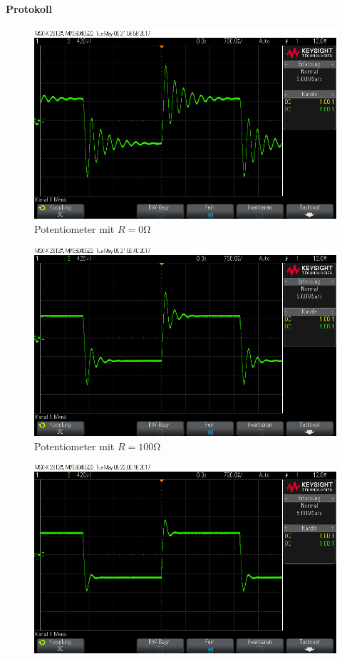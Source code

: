 \documentclass[10pt]{scrreprt}
\begin{document}
        \paragraph{Protokoll}
        \begin{center}
            \begin{figure}[H]
                \includegraphics[width=\textwidth]{scope_14.png}
                \caption{Potentiometer mit $R = 0\si{\ohm}$}
            \end{figure}
            \begin{figure}[H]
                \includegraphics[width=\textwidth]{scope_15.png}
                \caption{Potentiometer mit $R = 100\si{\ohm}$}
            \end{figure}
            \begin{figure}[H]
                \includegraphics[width=\textwidth]{scope_16.png}

\end{figure}
\end{center}
\end{document}
